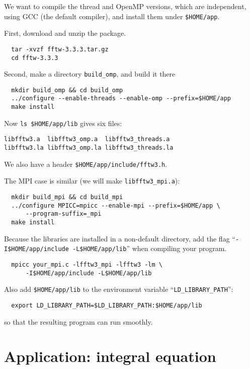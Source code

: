 \documentclass[12pt]{article}
\begin{document}
We want to compile the thread and OpenMP versions,
  which are independent, using GCC (the default compiler),
  and install them under \texttt{\$HOME/app}.


First, download and unzip the package.
\begin{verbatim}
  tar -xvzf fftw-3.3.3.tar.gz
  cd fftw-3.3.3
\end{verbatim}

Second, make a directory \texttt{build\_omp}, and build it there
\begin{verbatim}
  mkdir build_omp && cd build_omp
  ../configure --enable-threads --enable-omp --prefix=$HOME/app
  make install
\end{verbatim}

Now \texttt{ls \$HOME/app/lib} gives six files:
\begin{verbatim}
libfftw3.a  libfftw3_omp.a  libfftw3_threads.a
libfftw3.la libfftw3_omp.la libfftw3_threads.la
\end{verbatim}
We also have a header \texttt{\$HOME/app/include/fftw3.h}.


The MPI case is similar (we will make \texttt{libfftw3\_mpi.a}):
\begin{verbatim}
  mkdir build_mpi && cd build_mpi
  ../configure MPICC=mpicc --enable-mpi --prefix=$HOME/app \
      --program-suffix=_mpi
  make install
\end{verbatim}



Because the libraries are installed in a non-default directory,
add the flag ``\texttt{-I\$HOME/app/include -L\$HOME/app/lib}''
when compiling your program.
\begin{verbatim}
  mpicc your_mpi.c -lfftw3_mpi -lfftw3 -lm \
      -I$HOME/app/include -L$HOME/app/lib
\end{verbatim}
Also add \texttt{\$HOME/app/lib} to the environment variable
  ``\texttt{LD\_LIBRARY\_PATH}'':
\begin{verbatim}
  export LD_LIBRARY_PATH=$LD_LIBRARY_PATH:$HOME/app/lib
\end{verbatim}
so that the resulting program can run smoothly.



\section{Application: integral equation}
\end{document}
